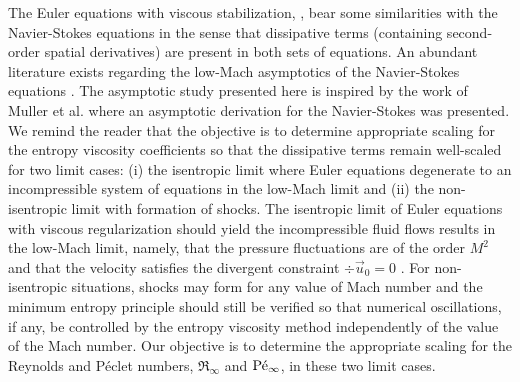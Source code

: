The Euler equations with viscous stabilization, , bear some similarities with the Navier-Stokes equations in the sense that dissipative terms (containing second-order spatial derivatives) are present in both sets of equations. An abundant literature exists regarding the low-Mach asymptotics of the Navier-Stokes equations \cite{LowMach1, LowMach2, LowMach3, Muller}.   
%
The asymptotic study presented here is inspired by the work of Muller et al. \cite{Muller} where an asymptotic derivation for the Navier-Stokes was presented. 
We remind the reader that the objective is to determine appropriate scaling for the entropy viscosity coefficients so that the dissipative terms remain well-scaled for two limit cases: 
(i) the isentropic limit where Euler equations degenerate to an incompressible system of equations in the low-Mach limit and 
(ii) the non-isentropic limit with formation of shocks. 
The isentropic limit of Euler equations with viscous regularization should yield the incompressible fluid flows results in the low-Mach limit, namely, that the pressure fluctuations are of the order $M^2$ and that the velocity satisfies the divergent constraint $\div \vec{u}_0 = 0$ \cite{LowMach1, LowMach2, LowMach3}. For non-isentropic situations, shocks may form for any value of Mach number and the minimum entropy principle should still be verified so that numerical oscillations, if any, be controlled by the entropy viscosity method independently of the value of the Mach number.
Our objective is to determine the appropriate scaling for the Reynolds and P\'eclet numbers, $\Re_\infty$ and $\textrm{P\'e}_\infty$, in these two limit cases.

